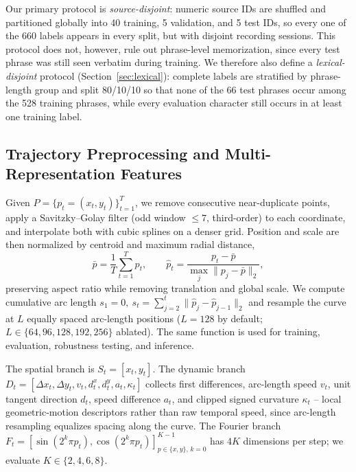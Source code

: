 \documentclass[runningheads]{llncs}
\begin{document}
Our primary protocol is \emph{source-disjoint}: numeric source IDs are shuffled and partitioned globally into 40 training, 5 validation, and 5 test IDs, so every one of the 660 labels appears in every split, but with disjoint recording sessions. This protocol does not, however, rule out phrase-level memorization, since every test phrase was still seen verbatim during training. We therefore also define a \emph{lexical-disjoint} protocol (Section~\ref{sec:lexical}): complete labels are stratified by phrase-length group and split 80/10/10 so that none of the 66 test phrases occur among the 528 training phrases, while every evaluation character still occurs in at least one training label.

\subsection{Trajectory Preprocessing and Multi-Representation Features}
Given $P=\{p_t=(x_t,y_t)\}_{t=1}^{T}$, we remove consecutive near-duplicate points, apply a Savitzky--Golay filter (odd window $\le7$, third-order) to each coordinate, and interpolate both with cubic splines on a denser grid. Position and scale are then normalized by centroid and maximum radial distance,
\begin{equation}
\bar p=\frac{1}{T}\sum_{t=1}^{T}p_t,\qquad
\hat p_t=\frac{p_t-\bar p}{\max_j\lVert p_j-\bar p\rVert_2},
\end{equation}
preserving aspect ratio while removing translation and global scale. We compute cumulative arc length $s_1=0,\ s_t=\sum_{j=2}^{t}\lVert \hat p_j-\hat p_{j-1}\rVert_2$ and resample the curve at $L$ equally spaced arc-length positions ($L=128$ by default; $L\in\{64,96,128,192,256\}$ ablated). The same function is used for training, evaluation, robustness testing, and inference.

The spatial branch is $S_t=[x_t,y_t]$. The dynamic branch $D_t=[\Delta x_t,\Delta y_t,v_t,d^x_t,d^y_t,a_t,\kappa_t]$ collects first differences, arc-length speed $v_t$, unit tangent direction $d_t$, speed difference $a_t$, and clipped signed curvature $\kappa_t$ -- local geometric-motion descriptors rather than raw temporal speed, since arc-length resampling equalizes spacing along the curve. The Fourier branch $F_t=[\sin(2^k\pi p_t),\cos(2^k\pi p_t)]_{p\in\{x,y\},\,k=0}^{K-1}$ has $4K$ dimensions per step; we evaluate $K\in\{2,4,6,8\}$.
\end{document}
